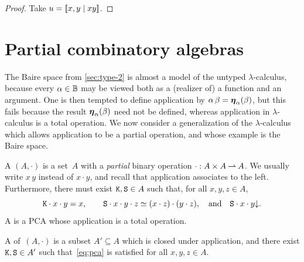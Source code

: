 \begin{proof}
  Take $u = [\![x, y \mid x y]\!]$.
\end{proof}




\section{Partial combinatory algebras}
\label{sec:pcas}

The Baire space from \cref{sec:type-2} is almost a model of the
untyped $\lambda$-calculus, because every $\alpha \in \mathbb{B}$ may be
viewed both as a (realizer of) a function and an argument. One is then
tempted to define application by $\alpha \, \beta =
\text{\boldmath{$\eta$}}_{\alpha}(\beta)$, but this fails because the result $\text{\boldmath{$\eta$}}_{\alpha}(\beta)$ need not
be defined, whereas application in $\lambda$-calculus is a total
operation. We now consider a generalization of the $\lambda$-calculus
which allows application to be a partial operation, and whose example
is the Baire space.

\begin{definition}
  \label{def:pca}%
  A  $(A, {\cdot})$ is a
  set~$A$ with a
  \emph{partial} binary operation ${\cdot} : A \times A \mathbin{\rightharpoonup} A$. We
  usually write $x\, y$ instead of $x \cdot y$, and recall that
  application associates to the left. Furthermore, there must exist
  $\mathtt{K}, \mathtt{S} \in A$ such that, for all $x, y, z \in A$,
  \begin{equation}
    \label{eq:pca}%
    \combK \cdot x \cdot y = x,
    \qquad
    \combS \cdot x \cdot y \cdot z \simeq (x \cdot z) \cdot (y \cdot z),
    \quad\text{and}\quad
    \defined{\combS \cdot x \cdot y}.
  \end{equation}
  A  is a PCA whose application
  is a total operation.

  A  of~$(A, {\cdot})$ is a subset $A' \subseteq A$
  which is closed under application, and there exist $\mathtt{K}, \mathtt{S}
  \in A'$ such that~\eqref{eq:pca} is satisfied for all $x, y, z \in
  A$.
\end{definition}

